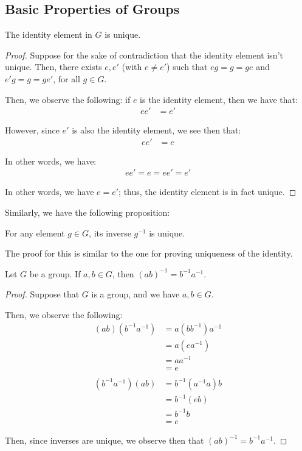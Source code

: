 \documentclass[openany]{book}
\begin{document}
\subsection{Basic Properties of Groups}
\begin{prop}
	The identity element in $G$ is unique.
\end{prop}
\begin{proof}
	Suppose for the sake of contradiction that the identity element isn't unique. Then, there exists $e, e'$ (with $e \neq e'$) such that $eg = g = ge$ and $e'g = g = ge'$, for all $g \in G$.
	
	Then, we observe the following: if $e$ is the identity element, then we have that:
	\begin{align*}
		ee' &= e'
	\end{align*}

	However, since $e'$ is also the identity element, we see then that:
	\begin{align*}
		ee' &= e
	\end{align*}

	In other words, we have:
	\begin{align*}
		ee' = e = ee' = e'
	\end{align*}

	In other words, we have $e = e'$; thus, the identity element is in fact unique.
\end{proof}

Similarly, we have the following proposition:
\begin{prop}
	For any element $g \in G$, its inverse $g^{-1}$ is unique.
\end{prop}

The proof for this is similar to the one for proving uniqueness of the identity.

\begin{prop}
	Let $G$ be a group. If $a, b \in G$, then $(ab)^{-1} = b^{-1}a^{-1}$.
\end{prop}
\begin{proof}
	Suppose that $G$ is a group, and we have $a, b \in G$.
	
	Then, we observe the following:
	\begin{align*}
		(ab)(b^{-1}a^{-1}) &= a(bb^{-1})a^{-1} \\
		&= a(ea^{-1}) \\
		&= aa^{-1} \\
		&= e \\
		\\
		(b^{-1}a^{-1})(ab) &= b^{-1}(a^{-1}a)b \\
		&= b^{-1}(eb) \\
		&= b^{-1}b \\
		&= e
	\end{align*}

	Then, since inverses are unique, we observe then that $(ab)^{-1} = b^{-1}a^{-1}$.
\end{proof}
\end{document}
